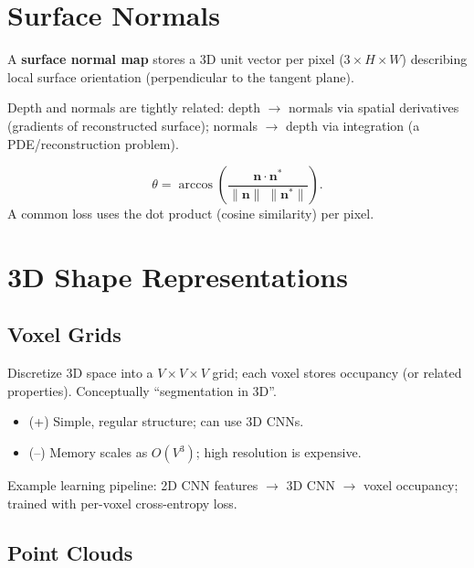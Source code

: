 \documentclass[11pt, oneside]{book}
\newcommand{\vct}[1]{\bm{#1}}           %
\begin{document}
\section{Surface Normals}

\begin{defbox}[title={Surface Normal Map}]
A \textbf{surface normal map} stores a 3D unit vector per pixel ($3\times H\times W$) describing local surface orientation
(perpendicular to the tangent plane).
\end{defbox}

Depth and normals are tightly related:
depth $\rightarrow$ normals via spatial derivatives (gradients of reconstructed surface);
normals $\rightarrow$ depth via integration (a PDE/reconstruction problem).

\begin{thmbox}[title={Angular Error for Normals}]
\[
\theta = \arccos\!\left(\frac{\vct{n}\cdot \vct{n}^\ast}{\|\vct{n}\|\;\|\vct{n}^\ast\|}\right).
\]
A common loss uses the dot product (cosine similarity) per pixel.
\end{thmbox}

\section{3D Shape Representations}

\subsection{Voxel Grids}

\begin{defbox}[title={Voxel Grid}]
Discretize 3D space into a $V\times V\times V$ grid; each voxel stores occupancy (or related properties).
Conceptually ``segmentation in 3D''.
\end{defbox}
\begin{itemize}
  \item (+) Simple, regular structure; can use 3D CNNs.
  \item (--) Memory scales as $O(V^3)$; high resolution is expensive.
\end{itemize}
Example learning pipeline: 2D CNN features $\rightarrow$ 3D CNN $\rightarrow$ voxel occupancy; trained with per-voxel cross-entropy loss.

\subsection{Point Clouds}
\end{document}
